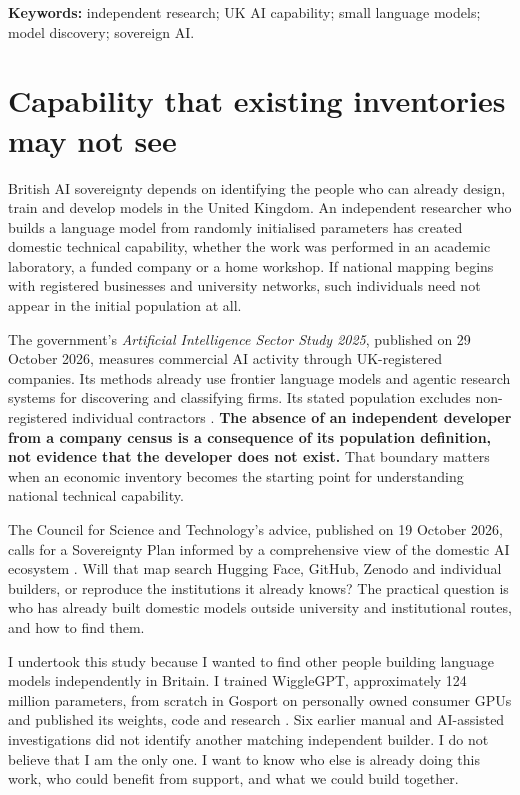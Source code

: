 \documentclass[11pt,a4paper]{article}
\begin{document}
{}

\textbf{Keywords:} independent research; UK AI capability; small language models; model discovery; sovereign AI.

\section{Capability that existing inventories may not see}
British AI sovereignty depends on identifying the people who can already
design, train and develop models in the United Kingdom. An independent
researcher who builds a language model from randomly initialised parameters
has created domestic technical capability, whether the work was performed
in an academic laboratory, a funded company or a home workshop. If national
mapping begins with registered businesses and university networks, such
individuals need not appear in the initial population at all.

The government's \emph{Artificial Intelligence Sector Study 2025}, published
on 29 October 2026, measures commercial AI activity through UK-registered
companies. Its methods already use frontier language models and agentic
research systems for discovering and classifying firms. Its stated population
excludes non-registered individual contractors \cite{sectorstudy}.
\textbf{The absence of an independent developer from a company census is
a consequence of its population definition, not evidence that the developer
does not exist.} That boundary matters when an economic inventory becomes
the starting point for understanding national technical capability.

The Council for Science and Technology's advice, published on 19 October
2026, calls for a Sovereignty Plan informed by a comprehensive view of
the domestic AI ecosystem \cite{cst}. Will that map search Hugging Face,
GitHub, Zenodo and individual builders, or reproduce the institutions it
already knows? The practical question is who has already built domestic
models outside university and institutional routes, and how to find them.

I undertook this study because I wanted to find other people building
language models independently in Britain. I trained WiggleGPT, approximately 124 million parameters, from scratch
in Gosport on personally owned consumer GPUs and published its weights,
code and research \cite{wigglegpt,wigglecard}. Six earlier manual and
AI-assisted investigations did not identify another matching independent
builder. I do not believe that I am the only one. I want to know who else
is already doing this work, who could benefit from support, and what we
could build together.
\end{document}
